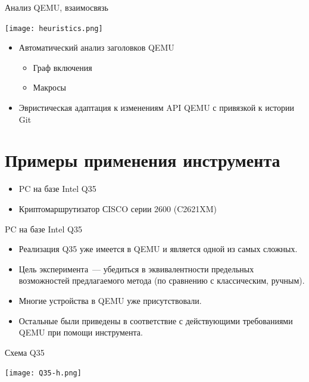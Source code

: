\documentclass[unicode,hyperref={unicode=true}]{beamer}
\newcommand*{\sectionpagekb}{\usebeamertemplate*{section page kb}}
\theoremstyle{definition}
\theoremstyle{plain}
\begin{document}
\begin{frame}{Анализ QEMU, взаимосвязь}
\begin{minipage}{0.35\textwidth}
\texttt{[image: heuristics.png]}
\end{minipage}
\hfill
\begin{minipage}{0.63\textwidth}
\begin{itemize}
\item Автоматический анализ заголовков QEMU
    \begin{itemize}
    \item Граф включения
    \item Макросы
    \end{itemize}
\item Эвристическая адаптация к изменениям API QEMU с привязкой к истории Git
\end{itemize}
\end{minipage}
\end{frame}



\section{Примеры применения инструмента}
\begin{frame}
\sectionpagekb
\begin{itemize}
\item PC на базе Intel Q35
\item Криптомаршрутизатор СISCO серии 2600 (C2621XM)
\end{itemize}
\end{frame}



\begin{frame}{PC на базе Intel Q35}
\begin{itemize}
\item Реализация Q35 уже имеется в QEMU и является одной из самых сложных.
\item Цель эксперимента~--- убедиться в эквивалентности предельных возможностей
предлагаемого метода (по сравнению с классическим, ручным).
\item Многие устройства в QEMU уже присутствовали.
\item Остальные были приведены в соответствие с действующими требованиями
QEMU при помощи инструмента.
\end{itemize}
\end{frame}



\begin{frame}{Схема Q35}
\begin{center}
\texttt{[image: Q35-h.png]}
\end{center}
\end{frame}
\end{document}
